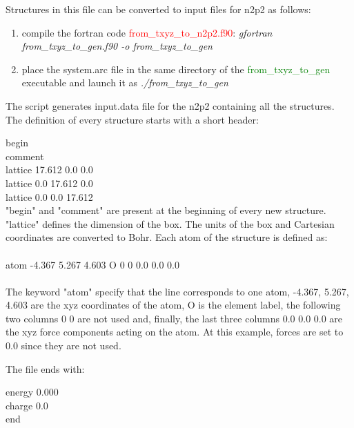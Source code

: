 \documentclass[12pt]{article}
\begin{document}
Structures in this file can be converted to input files for n2p2 as follows:

\begin{enumerate}
    \item compile the fortran code \textcolor{red}{from\_txyz\_to\_n2p2.f90}:
    \textit{gfortran from\_txyz\_to\_gen.f90 -o from\_txyz\_to\_gen} 
    \item place the system.arc file in the same directory of the \textcolor{green}{from\_txyz\_to\_gen} executable and launch it as \textit{./from\_txyz\_to\_gen}
\end{enumerate}
The script generates input.data file for the n2p2 containing all the structures. The definition of every structure starts with a short header:

 begin \\
 comment \\
 lattice 17.612 0.0 0.0 \\
 lattice 0.0 17.612 0.0 \\
 lattice 0.0 0.0 17.612 \\

"begin" and "comment" are present at the beginning of every new structure. "lattice" defines the dimension of the box. The units of the box and Cartesian coordinates are converted to Bohr.
Each atom of the structure is defined as: \\ \\
 atom \hspace{0.5cm}  -4.367  \hspace{0.5cm}      5.267    \hspace{0.5cm}    4.603  \hspace{0.5cm}    O \hspace{0.5cm} 0 0 \hspace{0.5cm} 0.0 0.0 0.0 \\ \\
The keyword "atom" specify that the line corresponds to one atom, -4.367, 5.267, 4.603 are the xyz coordinates of the atom, O is the element label, the following two columns 0 0 are not used  and, finally, the last three columns 0.0 0.0 0.0 are the xyz force components acting on the atom. At this example, forces are set to 0.0 since they are not used.

The file ends with: 

 energy 0.000 \\
 charge 0.0 \\
 end \\
\end{document}
